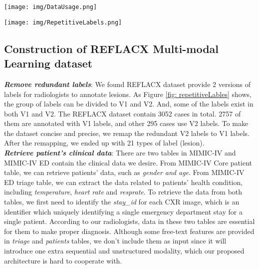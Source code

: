 \documentclass[journal,twoside,web, 11pt]{ieeecolor}
\begin{document}
\begin{figure*}[!h]
    \centering
    \texttt{[image: img/DataUsage.png]}
    \centering
    \caption{Overview of the datasets used in training model.}
    \label{fig: DataUsage}
\end{figure*}


\begin{figure*}[!h]
    \centering
    \texttt{[image: img/RepetitiveLabels.png]}
    \caption{Repetitive labels in REFLACX dataset}
    \label{fig: repetitiveLables}
\end{figure*}

\subsection{Construction of REFLACX Multi-modal Learning dataset}

\textbf{\textit{Remove redundant labels}}: We found REFLACX dataset provide 2 versions of labels for radiologists to annotate lesions. As Figure \ref{fig: repetitiveLables} shows, the group of labels can be divided to V1 and V2. And, some of the labels exist in both V1 and V2. The REFLACX dataset contain 3052 cases in total. 2757 of them are annotated with V1 labels, and other 295 cases use V2 labels. To make the dataset concise and precise, we remap the redundant V2 labels to V1 labels. After the remapping, we ended up with 21 types of label (lesion). \\

\textbf{\textit{Retrieve patient's clinical data}}:  There are two tables in MIMIC-IV and MIMIC-IV ED contain the clinical data we desire. From MIMIC-IV Core patient table, we can retrieve patients' data, such as \textit{gender and age}. From MIMIC-IV ED triage table, we can extract the data related to patients' health condition, including \textit{temperature}, \textit{heart rate} and \textit{resprate}. To retrieve the data from both tables, we first need to identify the \textit{stay\_id} for each CXR image, which is an identifier which uniquely identifying a single emergency department stay for a single patient. According to our radiologists, data in these two tables are essential for them to make proper diagnosis. Although some free-text features are provided in \textit{triage} and \textit{patients} tables, we don't include them as input since it will introduce one extra sequential and unstructured modality, which our proposed architecture is hard to cooperate with.\\
\\
\end{document}
